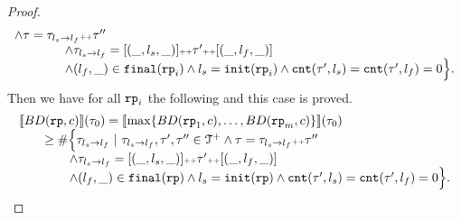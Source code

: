 \begin{proof}
\[\begin{array}{l}
    \land \mathtt{\tau} = \mathtt{\tau}_{l_s \to l_f} {\scriptscriptstyle ++} \mathtt{\tau}''
    \\ \qquad \qquad
    \land \mathtt{\tau}_{l_s \to l_f} = [(\_, l_s, \_)] {\scriptscriptstyle ++} \mathtt{\tau}' {\scriptscriptstyle ++} [(\_, l_f, \_)]
    \\ \qquad \qquad
    \land (l_{f}, \_) \in \mathtt{final}(\mathtt{rp}_i)
    \land l_s = \mathtt{init}(\mathtt{rp}_i)
    \land \mathtt{cnt}(\mathtt{\tau}', l_s) = \mathtt{cnt}(\mathtt{\tau}', l_f) = 0 
    \Big\}.
      \end{array}
\]
Then we have for all $\mathtt{rp}_i$ the following and this case is proved.
\[
  \begin{array}{l}
    \econfig{BD(\rprog, c)}(\trace_0) = 
    \econfig{ \max\left\{ BD(\rprog_1, c), \ldots, BD(\rprog_m, c) \right\}}(\trace_0)
    \\ \qquad 
    \geq
    \# \Big\{\trace_{l_s \to l_f} ~\vert~ \trace_{l_s \to l_f}, \trace', \trace''\in \ftdom
    \land \trace = \trace_{l_s \to l_f} \tracecat \trace''
    \\ \qquad \qquad
    \land \trace_{l_s \to l_f} = [(\_, l_s, \_)] \tracecat \trace' \tracecat [(\_, l_f, \_)]
    \\ \qquad \qquad
    \land (l_{f}, \_) \in \absfinal(\rprog)
    \land l_s = \absinit(\rprog)
    \land \counter(\trace', l_s) = \counter(\trace', l_f) = 0 
    \Big\}.
      \end{array}
\]


\end{proof}
